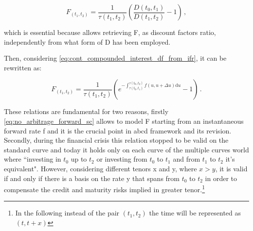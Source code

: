 \begin{equation}
F_{(t_{1},t_{2})}=\dfrac{1}{\tau(t_{1},t_{2})}\left(\dfrac{D(t_{0},t_{1})}{D(t_{1},t_{2})}-1\right)\,,
\label{eq:no_arbitrage_forward_sc}
\end{equation}
 
which is essential because allows retrieving F, as discount factors ratio, independently from what form of D has been employed.

Then, considering \eqref{eq:cont_compounded_interest_df_from_ifr}, it can be rewritten as:

\begin{equation}
F_{(t_{1},t_{2})}=\dfrac{1}{\tau(t_{1},t_{2})}\left(e^{-\int_{\tau(t_{0},t_{1})}^{\tau(t_{0},t_{2})}f(u,u+ \Delta u) \mathrm{d}u}-1\right)\,.
\label{eq:no_arbitrage_forward_sc_int}
\end{equation}

These relations are fundamental for two reasons, firstly \eqref{eq:no_arbitrage_forward_sc} allows to model F starting from an instantaneous forward rate f and it is the crucial point in abcd framework and its revision. Secondly, during the financial crisis this relation stopped to be valid on the standard curve and today it holds only on each curve of the multiple curves world where ``investing in $t_{0}$ up to $t_{2}$ or investing from $t_{0}$ to $t_{1}$ and from $t_{1}$ to $t_{2}$ it's equivalent". However, considering different tenors x and y, where $ x>y$, it is valid if and only if there is a basis on the rate y that spans from $t_{0}$ to $t_{2}$ in order to compensate the credit and maturity risks implied in greater tenor.\footnote{In the following instead of the pair $(t_{1},t_{2})$ the time will be represented as $(t,t+x)$}
